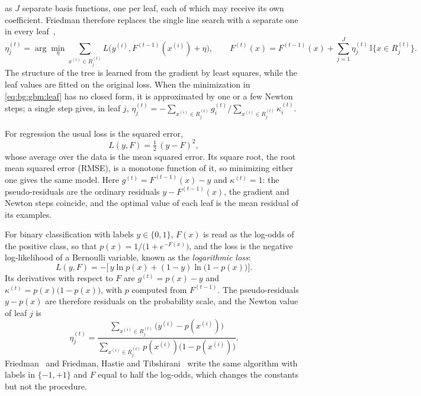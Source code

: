     as $J$ separate basis functions, one per leaf, each of which may receive its
    own coefficient. Friedman therefore replaces the single line search with a
    separate one in every leaf~\cite{friedman2001},
    \begin{equation}
    \eta_j^{(t)} = \arg\min_{\eta}
    \sum_{x^{(i)} \in R_j^{(t)}} L\bigl( y^{(i)}, F^{(t-1)}(x^{(i)}) + \eta \bigr),
    \qquad
    F^{(t)}(x) = F^{(t-1)}(x) + \sum_{j=1}^{J} \eta_j^{(t)}\,
    \mathbb{I}{\{x \in R_j^{(t)}\}}.
    \label{eq:bg:gbm:leaf}
    \end{equation}
    The structure of the tree is learned from the gradient by least squares, while
    the leaf values are fitted on the original loss. When the minimization in
    \eqref{eq:bg:gbm:leaf} has no closed form, it is approximated by one or a
    few Newton steps; a single step gives, in leaf $j$,
    $\eta_j^{(t)} = -\sum_{x^{(i)} \in R_j^{(t)}} g_i^{(t)} \big/
    \sum_{x^{(i)} \in R_j^{(t)}} \kappa_i^{(t)}$.
    
    For regression the usual loss is the squared error,
    \begin{equation}
    L(y, F) = \tfrac{1}{2}\,(y - F)^{2},
    \label{eq:bg:gbm:mse}
    \end{equation}
    whose average over the data is the mean squared error. Its square root, the
    root mean squared error (RMSE), is a monotone function of it, so minimizing
    either one gives the same model. Here $g^{(t)} = F^{(t-1)}(x) - y$ and
    $\kappa^{(t)} = 1$: the pseudo-residuals are the ordinary residuals
    $y - F^{(t-1)}(x)$, the gradient and Newton steps coincide, and the optimal
    value of each leaf is the mean residual of its examples.
    
    For binary classification with labels $y \in \{0, 1\}$, $F(x)$ is read as the
    log-odds of the positive class, so that
    $p(x) = 1 / \bigl(1 + e^{-F(x)}\bigr)$, and the loss is the negative
    log-likelihood of a Bernoulli variable, known as the \emph{logarithmic loss}:
    \begin{equation}
    L(y, F) = -\bigl[\, y \ln p(x) + (1 - y) \ln\bigl(1 - p(x)\bigr) \bigr].
    \label{eq:bg:gbm:logloss}
    \end{equation}
    Its derivatives with respect to $F$ are $g^{(t)} = p(x) - y$ and
    $\kappa^{(t)} = p(x)\bigl(1 - p(x)\bigr)$, with $p$ computed from
    $F^{(t-1)}$. The pseudo-residuals $y - p(x)$ are therefore residuals on the
    probability scale, and the Newton value of leaf $j$ is
    \begin{equation}
    \eta_j^{(t)} =
    \frac{\sum_{x^{(i)} \in R_j^{(t)}} \bigl( y^{(i)} - p(x^{(i)}) \bigr)}
         {\sum_{x^{(i)} \in R_j^{(t)}} p(x^{(i)}) \bigl( 1 - p(x^{(i)}) \bigr)}.
    \label{eq:bg:gbm:loglossleaf}
    \end{equation}
    Friedman~\cite{friedman2001} and Friedman, Hastie and
    Tibshirani~\cite{friedman2000} write the same algorithm with labels in
    $\{-1, +1\}$ and $F$ equal to half the log-odds, which changes the constants
    but not the procedure.
    
